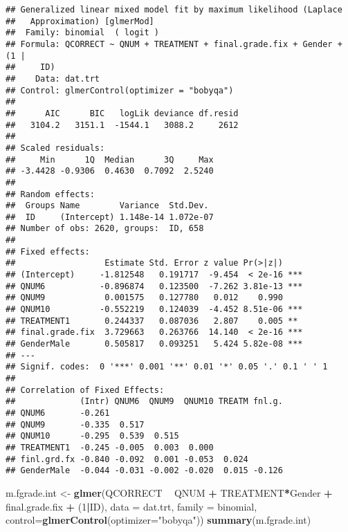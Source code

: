 \documentclass[]{article}
\newenvironment{Shaded}{\begin{snugshade}}{\end{snugshade}}
\newcommand{\KeywordTok}[1]{\textcolor[rgb]{0.13,0.29,0.53}{\textbf{#1}}}
\newcommand{\DataTypeTok}[1]{\textcolor[rgb]{0.13,0.29,0.53}{#1}}
\newcommand{\DecValTok}[1]{\textcolor[rgb]{0.00,0.00,0.81}{#1}}
\newcommand{\StringTok}[1]{\textcolor[rgb]{0.31,0.60,0.02}{#1}}
\newcommand{\OperatorTok}[1]{\textcolor[rgb]{0.81,0.36,0.00}{\textbf{#1}}}
\newcommand{\NormalTok}[1]{#1}
\begin{document}
\begin{verbatim}
## Generalized linear mixed model fit by maximum likelihood (Laplace
##   Approximation) [glmerMod]
##  Family: binomial  ( logit )
## Formula: QCORRECT ~ QNUM + TREATMENT + final.grade.fix + Gender + (1 |  
##     ID)
##    Data: dat.trt
## Control: glmerControl(optimizer = "bobyqa")
## 
##      AIC      BIC   logLik deviance df.resid 
##   3104.2   3151.1  -1544.1   3088.2     2612 
## 
## Scaled residuals: 
##     Min      1Q  Median      3Q     Max 
## -3.4428 -0.9306  0.4630  0.7092  2.5240 
## 
## Random effects:
##  Groups Name        Variance  Std.Dev. 
##  ID     (Intercept) 1.148e-14 1.072e-07
## Number of obs: 2620, groups:  ID, 658
## 
## Fixed effects:
##                  Estimate Std. Error z value Pr(>|z|)    
## (Intercept)     -1.812548   0.191717  -9.454  < 2e-16 ***
## QNUM6           -0.896874   0.123500  -7.262 3.81e-13 ***
## QNUM9            0.001575   0.127780   0.012    0.990    
## QNUM10          -0.552219   0.124039  -4.452 8.51e-06 ***
## TREATMENT1       0.244337   0.087036   2.807    0.005 ** 
## final.grade.fix  3.729663   0.263766  14.140  < 2e-16 ***
## GenderMale       0.505817   0.093251   5.424 5.82e-08 ***
## ---
## Signif. codes:  0 '***' 0.001 '**' 0.01 '*' 0.05 '.' 0.1 ' ' 1
## 
## Correlation of Fixed Effects:
##             (Intr) QNUM6  QNUM9  QNUM10 TREATM fnl.g.
## QNUM6       -0.261                                   
## QNUM9       -0.335  0.517                            
## QNUM10      -0.295  0.539  0.515                     
## TREATMENT1  -0.245 -0.005  0.003  0.000              
## finl.grd.fx -0.840 -0.092  0.001 -0.053  0.024       
## GenderMale  -0.044 -0.031 -0.002 -0.020  0.015 -0.126
\end{verbatim}

\begin{Shaded}
\begin{Highlighting}[]
\NormalTok{m.fgrade.int <-}\StringTok{ }\KeywordTok{glmer}\NormalTok{(QCORRECT }\OperatorTok{~}\StringTok{ }\NormalTok{QNUM }\OperatorTok{+}\StringTok{ }\NormalTok{TREATMENT}\OperatorTok{*}\NormalTok{Gender }\OperatorTok{+}\StringTok{ }\NormalTok{final.grade.fix }\OperatorTok{+}\StringTok{ }\NormalTok{(}\DecValTok{1}\OperatorTok{|}\NormalTok{ID), }
                \DataTypeTok{data =}\NormalTok{ dat.trt, }
                \DataTypeTok{family =}\NormalTok{ binomial, }\DataTypeTok{control=}\KeywordTok{glmerControl}\NormalTok{(}\DataTypeTok{optimizer=}\StringTok{"bobyqa"}\NormalTok{))}
\KeywordTok{summary}\NormalTok{(m.fgrade.int)}
\end{Highlighting}
\end{Shaded}
\end{document}

